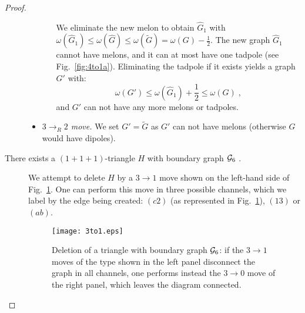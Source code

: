 \documentclass[10pt]{article}
\theoremstyle{plain}
\theoremstyle{definition}
\newcommand{\cG}{{\cal G}}
\begin{document}
\begin{proof}
\begin{description}
\begin{itemize}
\begin{itemize}
  We eliminate the new melon to obtain $\hat G_1$ with $\omega(\hat G_1) \le   \omega(\hat G) \le \omega(\tilde G) = \omega(G) - \frac{1}{2}$. The new graph $\hat G_1$ cannot have melons, and it can at most have one tadpole
 (see Fig.~\ref{fig:4to1a}). Eliminating the tadpole if it exists yields a graph $G'$ with:
 \[
  \omega(G') \le \omega(\hat G_1) + \frac{1}{2} \le \omega(G) \;,
 \] 
and $G'$ can not have any more melons or tadpoles.
    \end{itemize}
 

\item{\it $3\to_R 2$ move.} We set $G' = \tilde G$ as $G'$ can not have melons (otherwise $G$ would have dipoles).

\end{itemize}

\item[There exists a $(1+1+1)$-triangle $H$ with boundary graph $\cG_6$ .] We attempt to delete $H$ by a $3 \to 1$ move shown on the left-hand side of Fig.~\ref{fig:move6}. One can perform this
move in three possible channels, which we label by the edge being created: $(c2)$ (as represented in Fig.~\ref{fig:move6}), $(13)$ or $(ab)$. 

\begin{figure}[htb]
 \begin{center}
 \texttt{[image: 3to1.eps]}  
 \caption{Deletion of a triangle with boundary graph $\cG_6$: if the $3\to1$ moves of the type shown in the left panel disconnect the graph in all channels, one performs instead the $3\to 0$ move of 
 the right panel, which leaves the diagram connected.} \label{fig:move6}
 \end{center}
 \end{figure}
 

\end{description}
\end{proof}
\end{document}
